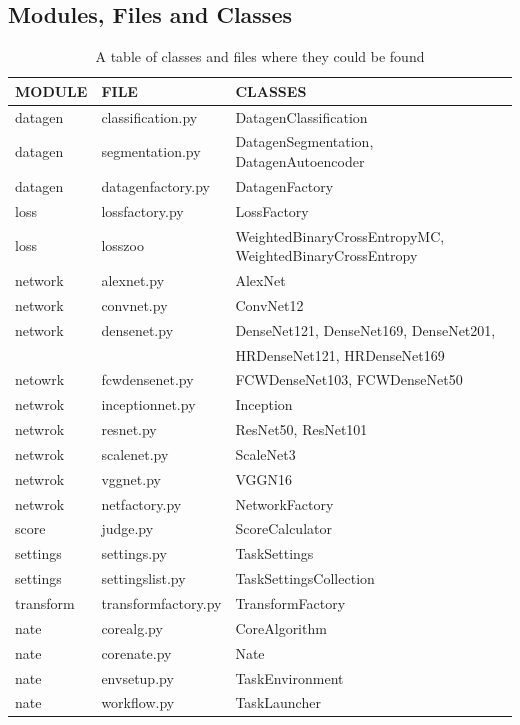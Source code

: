 \documentclass[a4paper, 11pt]{article}
\begin{document}
\subsection{Modules, Files and Classes}
\begin{center}
\begin{table}[h]
\begin{tabular}{l|l|l}
	\hline
	MODULE & FILE & CLASSES \\
	\hline
	datagen & classification.py & DatagenClassification \\
	datagen & segmentation.py &  DatagenSegmentation, DatagenAutoencoder \\
	datagen & datagenfactory.py & DatagenFactory \\
	\hline
	loss & lossfactory.py & LossFactory\\
	loss & losszoo & WeightedBinaryCrossEntropyMC, WeightedBinaryCrossEntropy\\
	\hline
	network & alexnet.py & AlexNet \\
	network & convnet.py &  ConvNet12\\
	network & densenet.py & DenseNet121, DenseNet169, DenseNet201, \\
	& & HRDenseNet121, HRDenseNet169\\
	netowrk & fcwdensenet.py & FCWDenseNet103, FCWDenseNet50 \\
	netwrok & inceptionnet.py &  Inception\\
	netwrok & resnet.py & ResNet50, ResNet101\\
	netwrok & scalenet.py & ScaleNet3\\
	netwrok & vggnet.py & VGGN16\\
	netwrok & netfactory.py & NetworkFactory\\
	\hline
	score & judge.py & ScoreCalculator\\
	\hline 
	settings & settings.py & TaskSettings \\
	settings & settingslist.py & TaskSettingsCollection \\
	\hline
	transform & transformfactory.py & TransformFactory \\
	\hline 
	nate & corealg.py &  CoreAlgorithm \\
	nate & corenate.py & Nate \\
	nate & envsetup.py & TaskEnvironment \\
	nate & workflow.py & TaskLauncher \\
	\hline
	
\end{tabular}
\caption{A table of classes and files where they could be found}
\end{table}
\end{center}
\end{document}
